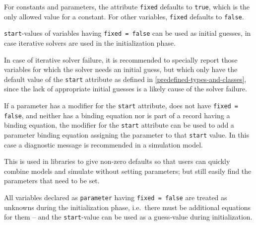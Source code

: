 For constants and parameters, the attribute \lstinline!fixed! defaults to \lstinline!true!, which is the only allowed value for a constant.  For other variables,
\lstinline!fixed! defaults to \lstinline!false!.

\lstinline!start!-values of variables having \lstinline!fixed = false! can be used as initial guesses, in case iterative solvers are used in the initialization phase.

\begin{nonnormative}
In case of iterative solver failure, it is recommended to specially report those variables for which the solver needs an initial guess, but which only have the default
value of the \lstinline!start! attribute as defined in \cref{predefined-types-and-classes}, since the lack of appropriate initial guesses is a likely cause of the solver failure.
\end{nonnormative}

If a parameter has a modifier for the \lstinline!start! attribute, does not have \lstinline!fixed = false!, and neither has a binding equation nor is part of a record having a binding equation,
the modifier for the \lstinline!start! attribute can be used to add a parameter binding equation assigning the parameter to that \lstinline!start! value.  In this case a diagnostic message is
recommended in a simulation model.

\begin{nonnormative}
This is used in libraries to give non-zero defaults so that users can quickly combine models and simulate without setting parameters; but still easily find the parameters
that need to be set.
\end{nonnormative}

All variables declared as \lstinline!parameter! having \lstinline!fixed = false! are treated as unknowns during the initialization phase, i.e.\ there must be additional equations for them -- and
the \lstinline!start!-value can be used as a guess-value during initialization.


